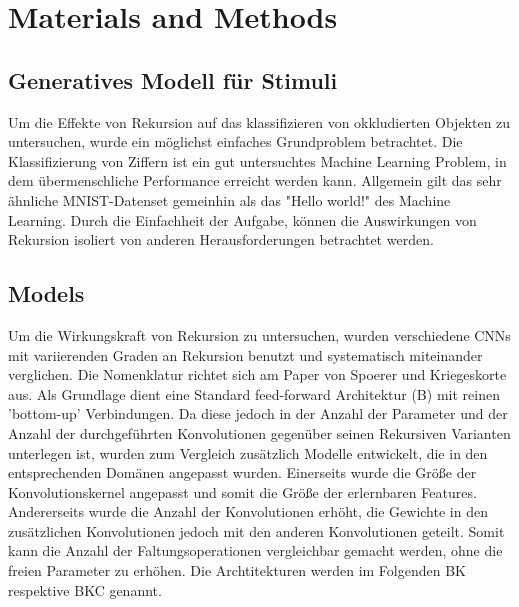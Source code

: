 \section{Materials and Methods}\label{materials_and_methods}
\subsection{Generatives Modell für Stimuli}
Um die Effekte von Rekursion auf das klassifizieren von okkludierten Objekten zu untersuchen, wurde ein möglichst einfaches Grundproblem betrachtet. Die Klassifizierung von Ziffern ist ein gut untersuchtes Machine Learning Problem, in dem übermenschliche Performance erreicht werden kann. Allgemein gilt das sehr ähnliche MNIST-Datenset gemeinhin als das "Hello world!" des Machine Learning. Durch die Einfachheit der Aufgabe, können die Auswirkungen von Rekursion isoliert von anderen Herausforderungen betrachtet werden. 
\subsection{Models}
Um die Wirkungskraft von Rekursion zu untersuchen, wurden verschiedene CNNs mit variierenden Graden an Rekursion benutzt und systematisch miteinander verglichen. Die Nomenklatur richtet sich am Paper von Spoerer und Kriegeskorte aus. Als Grundlage dient eine Standard feed-forward Architektur (B) mit reinen 'bottom-up' Verbindungen. Da diese jedoch in der Anzahl der Parameter und der Anzahl der durchgeführten Konvolutionen gegenüber seinen Rekursiven Varianten unterlegen ist, wurden zum Vergleich zusätzlich Modelle entwickelt, die in den entsprechenden Domänen angepasst wurden. Einerseits wurde die Größe der Konvolutionskernel angepasst und somit die Größe der erlernbaren Features. Andererseits wurde die Anzahl der Konvolutionen erhöht, die Gewichte in den zusätzlichen Konvolutionen jedoch mit den anderen Konvolutionen geteilt. Somit kann die Anzahl der Faltungsoperationen vergleichbar gemacht werden, ohne die freien Parameter zu erhöhen. Die Archtitekturen werden im Folgenden BK respektive BKC genannt. 
